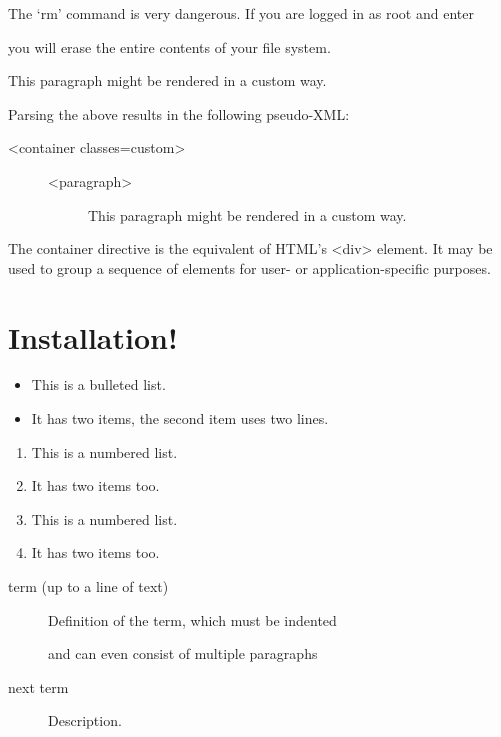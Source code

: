 \documentclass[letterpaper,10pt,english]{sphinxmanual}
\begin{document}
The `rm' command is very dangerous.  If you are logged
in as root and enter

\begin{sphinxVerbatim}[commandchars=\\\{\}]
 
  
\end{sphinxVerbatim}
\noindent
you will erase the entire contents of your file system.

This paragraph might be rendered in a custom way.

Parsing the above results in the following pseudo-XML:
\begin{description}
\item[{\textless{}container classes=\sphinxquotedblright{}custom\sphinxquotedblright{}\textgreater{}}] \leavevmode\begin{description}
\item[{\textless{}paragraph\textgreater{}}] \leavevmode
This paragraph might be rendered in a custom way.

\end{description}

\end{description}

The \sphinxquotedblleft{}container\sphinxquotedblright{} directive is the equivalent of HTML's \textless{}div\textgreater{} element.
It may be used to group a sequence of elements for user- or application-specific purposes.


\chapter{Installation!}
\label{\detokenize{usage/installation:installation}}\label{\detokenize{usage/installation::doc}}\begin{itemize}
\item {} 
This is a bulleted list.

\item {} 
It has two items, the second
item uses two lines.

\end{itemize}
\begin{enumerate}
\item {} 
This is a numbered list.

\item {} 
It has two items too.

\item {} 
This is a numbered list.

\item {} 
It has two items too.

\end{enumerate}
\begin{description}
\item[{term (up to a line of text)}] \leavevmode
Definition of the term, which must be indented

and can even consist of multiple paragraphs

\item[{next term}] \leavevmode
Description.

\end{description}
\end{document}
